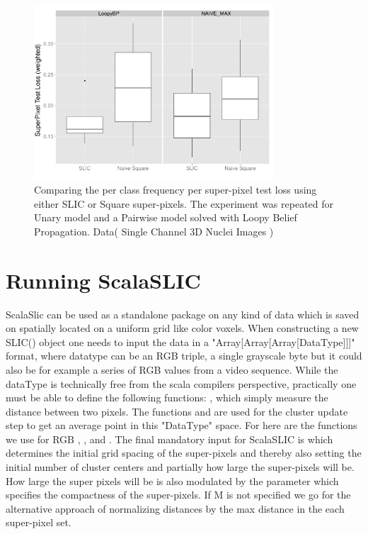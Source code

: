 %
\begin{figure}
  \centering
  \includegraphics[width=0.8\textwidth]{images/slicVsNaiveSquare_Supx_Nuclei.png}
  \caption{ Comparing the per class frequency per super-pixel test loss using either SLIC or Square super-pixels. The experiment was repeated for Unary model and a Pairwise model solved with Loopy Belief Propagation. Data( Single Channel 3D Nuclei Images \cite{ucsbData}) } 
  \label{fig:slicvssquareNucli}
\end{figure} 
%

\section{Running ScalaSLIC}
ScalaSlic can be used as a standalone package on any kind of data which is saved on spatially located on a uniform grid like color voxels. When constructing a new SLIC() object one needs to input the data in a "Array[Array[Array[DataType]]]" format, where datatype can be an RGB triple, a single grayscale byte but it could also be for example a series of RGB values from a video sequence. While the dataType is technically free from the scala compilers perspective, practically one must be able to define the following functions:  , which simply measure the distance between two pixels. The functions  and  are used for the cluster update step to get an average point in this "DataType" space. For here are the functions we use for RGB  , ,  and . The final mandatory input for ScalaSLIC is  which determines the initial grid spacing of the super-pixels and thereby also setting the initial number of cluster centers and partially how large the super-pixels will be. How large the super pixels will be is also modulated by the parameter  which specifies the compactness of the super-pixels. If M is not specified we go for the alternative approach of normalizing distances by the max distance in the each super-pixel set. 
